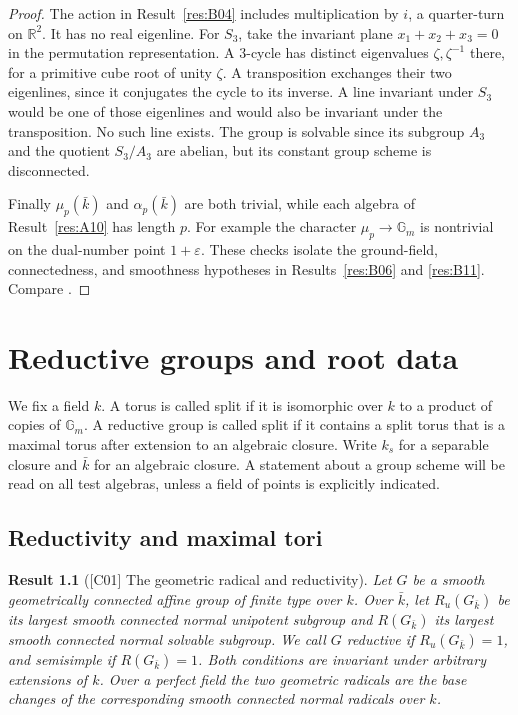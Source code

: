 \documentclass[11pt,a4paper,openany,oneside]{book}
\theoremstyle{resultstyle}
\newtheorem{statement}{Result}[chapter]
\newenvironment{result}[2]{\clubpenalty=10000\begin{statement}[\textnormal{[#1]} #2]\leavevmode\label{res:#1}\ignorespaces}{\end{statement}}
\theoremstyle{definition}
\numberwithin{equation}{chapter}
\newcommand{\Gm}{\mathbb{G}_m}
\begin{document}
\begin{proof}
The action in Result~\ref{res:B04} includes multiplication
by \(i\), a quarter-turn on \(\mathbb R^2\).
It has no real eigenline. For \(S_3\), take the invariant plane
\(x_1+x_2+x_3=0\) in the permutation representation.
A \(3\)-cycle has distinct eigenvalues \(\zeta,\zeta^{-1}\)
there, for a primitive cube root of unity \(\zeta\).
A transposition exchanges their two eigenlines, since it conjugates
the cycle to its inverse. A line invariant under \(S_3\) would
be one of those eigenlines and would also be invariant under
the transposition. No such line exists. The group is solvable
since its subgroup \(A_3\) and the quotient \(S_3/A_3\) are
abelian, but its constant group scheme is disconnected.

Finally \(\mu_p(\bar k)\) and \(\alpha_p(\bar k)\) are both trivial,
while each algebra of Result~\ref{res:A10} has length \(p\).
For example the character \(\mu_p\to\mathbb G_m\) is
nontrivial on the dual-number point \(1+\varepsilon\).
These checks isolate the ground-field, connectedness, and
smoothness hypotheses in Results~\ref{res:B06} and \ref{res:B11}.
Compare \cite[Example 12.27 and Theorem 16.30]{milne}.
\end{proof}
\chapter{Reductive groups and root data}
\label{ch:reductive}

We fix a field \(k\). A torus is called split if it is isomorphic over \(k\) to a product of copies of \(\Gm\). A reductive group is called split if it contains a split torus that is a maximal torus after extension to an algebraic closure. Write \(k_s\) for a separable closure and \(\bar k\) for an algebraic closure. A statement about a group scheme will be read on all test algebras, unless a field of points is explicitly indicated.

\section{Reductivity and maximal tori}

\begin{result}{C01}{The geometric radical and reductivity}
Let \(G\) be a smooth geometrically connected affine group of finite type over \(k\). Over \(\bar k\), let \(R_u(G_{\bar k})\) be its largest smooth connected normal unipotent subgroup and \(R(G_{\bar k})\) its largest smooth connected normal solvable subgroup. We call \(G\) \emph{reductive} if \(R_u(G_{\bar k})=1\), and \emph{semisimple} if \(R(G_{\bar k})=1\). Both conditions are invariant under arbitrary extensions of \(k\). Over a perfect field the two geometric radicals are the base changes of the corresponding smooth connected normal radicals over \(k\).
\end{result}
\end{document}
